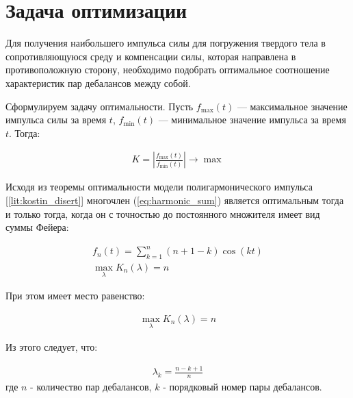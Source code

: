 \clearpage
\section{Задача оптимизации}

Для получения наибольшего импульса силы для погружения твердого тела в сопротивляющуюся среду и компенсации силы, которая направлена в противоположную сторону, необходимо подобрать оптимальное соотношение характеристик пар дебалансов между собой.

Сформулируем задачу оптимальности. Пусть $f_{\max}(t)$ --- максимальное значение импульса силы за время $t$, $f_{\min}(t)$ --- минимальное значение импульса за время $t$. Тогда:

\begin{equation}\label{eq:optim}
    \begin{aligned}
        K = \left| \frac{f_{\max}(t)}{f_{\min}(t)} \right| \rightarrow \max
    \end{aligned}
\end{equation}

Исходя из теоремы оптимальности модели полигармонического импульса [\ref{lit:kostin_disert}] многочлен (\ref{eq:harmonic_sum}) является оптимальным тогда и только тогда, когда он с точностью до постоянного множителя имеет вид суммы Фейера:

\begin{equation}\label{eq:feer}
    \begin{gathered}
        f_n(t) = \sum\limits_{k=1}^n (n+1-k) \cos(kt) \\
        \max \limits_{\lambda} K_n(\lambda) = n
    \end{gathered}
\end{equation}

При этом имеет место равенство:

\begin{equation}\label{eq:max_lambda}
    \begin{gathered}
        \max \limits_{\lambda} K_n(\lambda) = n
    \end{gathered}
\end{equation}

Из этого следует, что:

\begin{equation}\label{eq:opt_attitude}
    \begin{gathered}
        \lambda_k = \frac{n - k + 1}{n}
    \end{gathered}
\end{equation}
где $n$ - количество пар дебалансов, $k$ - порядковый номер пары дебалансов.

